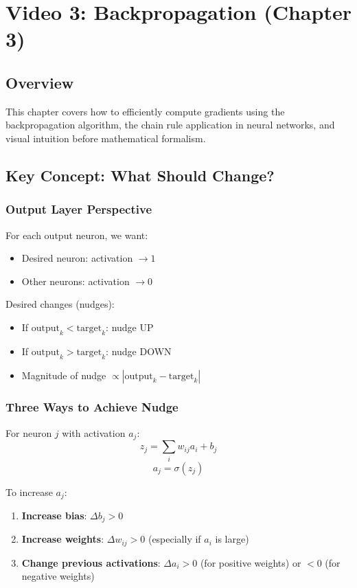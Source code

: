 \documentclass[11pt,a4paper]{article}
\begin{document}
\newpage

\section{Video 3: Backpropagation (Chapter 3)}

\subsection{Overview}
This chapter covers how to efficiently compute gradients using the backpropagation algorithm, the chain rule application in neural networks, and visual intuition before mathematical formalism.

\subsection{Key Concept: What Should Change?}

\subsubsection{Output Layer Perspective}
For each output neuron, we want:
\begin{itemize}
    \item Desired neuron: activation $\to 1$
    \item Other neurons: activation $\to 0$
\end{itemize}

Desired changes (nudges):
\begin{itemize}
    \item If $\text{output}_k < \text{target}_k$: nudge UP
    \item If $\text{output}_k > \text{target}_k$: nudge DOWN
    \item Magnitude of nudge $\propto |\text{output}_k - \text{target}_k|$
\end{itemize}

\subsubsection{Three Ways to Achieve Nudge}
For neuron $j$ with activation $a_j$:
\[
z_j = \sum_i w_{ij} a_i + b_j
\]
\[
a_j = \sigma(z_j)
\]

To increase $a_j$:
\begin{enumerate}
    \item \textbf{Increase bias}: $\Delta b_j > 0$
    \item \textbf{Increase weights}: $\Delta w_{ij} > 0$ (especially if $a_i$ is large)
    \item \textbf{Change previous activations}: $\Delta a_i > 0$ (for positive weights) or $< 0$ (for negative weights)
\end{enumerate}
\end{document}
